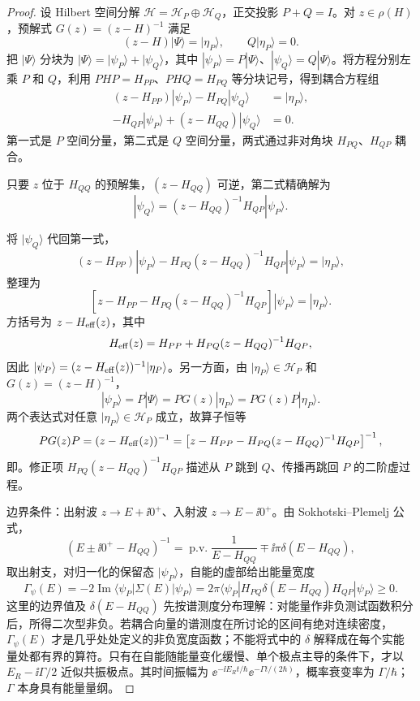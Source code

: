 \begin{proof}
设 Hilbert 空间分解 \(\mathcal H=\mathcal H_P\oplus\mathcal H_Q\)，正交投影 \(P+Q=I\)。对 \(z\in\rho(H)\)，预解式 \(G(z)=(z-H)^{-1}\) 满足
\[
 (z-H)|\Psi\rangle=|\eta_P\rangle,
 \qquad Q|\eta_P\rangle=0.
\]
把 \(|\Psi\rangle\) 分块为 \(|\Psi\rangle=|\psi_P\rangle+|\psi_Q\rangle\)，其中 \(|\psi_P\rangle=P|\Psi\rangle\)、\(|\psi_Q\rangle=Q|\Psi\rangle\)。将方程分别左乘 \(P\) 和 \(Q\)，利用 \(PHP=H_{PP}\)、\(PHQ=H_{PQ}\) 等分块记号，得到耦合方程组
\begin{align*}
 (z-H_{PP})|\psi_P\rangle-H_{PQ}|\psi_Q\rangle
 &=|\eta_P\rangle,\\
 -H_{QP}|\psi_P\rangle+(z-H_{QQ})|\psi_Q\rangle
 &=0.
\end{align*}
第一式是 \(P\) 空间分量，第二式是 \(Q\) 空间分量，两式通过非对角块 \(H_{PQ}\)、\(H_{QP}\) 耦合。

只要 \(z\) 位于 \(H_{QQ}\) 的预解集，\((z-H_{QQ})\) 可逆，第二式精确解为
\[
 |\psi_Q\rangle
 =(z-H_{QQ})^{-1}H_{QP}|\psi_P\rangle.
\]


将 \(|\psi_Q\rangle\) 代回第一式，
\[
 (z-H_{PP})|\psi_P\rangle
 -H_{PQ}(z-H_{QQ})^{-1}H_{QP}|\psi_P\rangle
 =|\eta_P\rangle,
\]
整理为
\[
 \left[z-H_{PP}
 -H_{PQ}(z-H_{QQ})^{-1}H_{QP}\right]|\psi_P\rangle
 =|\eta_P\rangle.
\]
方括号为 $z-H_{\rm eff}(z)$，其中
\[
 H_{\rm eff}(z)=H_{PP}+H_{PQ}(z-H_{QQ})^{-1}H_{QP},
\]
因此 \(|\psi_P\rangle=(z-H_{\rm eff}(z))^{-1}|\eta_P\rangle\)。另一方面，由 \(|\eta_P\rangle\in\mathcal H_P\) 和 \(G(z)=(z-H)^{-1}\)，
\[
 |\psi_P\rangle=P|\Psi\rangle=PG(z)|\eta_P\rangle=PG(z)P|\eta_P\rangle.
\]
两个表达式对任意 \(|\eta_P\rangle\in\mathcal H_P\) 成立，故算子恒等
\[
 PG(z)P=(z-H_{\rm eff}(z))^{-1}
 =\left[z-H_{PP}-H_{PQ}(z-H_{QQ})^{-1}H_{QP}\right]^{-1},
\]
即。修正项 \(H_{PQ}(z-H_{QQ})^{-1}H_{QP}\) 描述从 \(P\) 跳到 \(Q\)、传播再跳回 \(P\) 的二阶虚过程。

边界条件：出射波 \(z\to E+\ii0^+\)、入射波 \(z\to E-\ii0^+\)。由 Sokhotski--Plemelj 公式，
\[
 (E\pm\ii0^+-H_{QQ})^{-1}
 =\operatorname{p.v.}\frac1{E-H_{QQ}}
 \mp\ii\pi\delta(E-H_{QQ}),
\]
取出射支，对归一化的保留态 $|\psi_P\rangle$，自能的虚部给出能量宽度
\[
 \Gamma_\psi(E)=-2\operatorname{Im}\langle\psi_P|\Sigma(E)|\psi_P\rangle
 =2\pi\langle\psi_P|H_{PQ}\delta(E-H_{QQ})H_{QP}|\psi_P\rangle\ge0.
\]
这里的边界值及 $\delta(E-H_{QQ})$ 先按谱测度分布理解：对能量作非负测试函数积分后，所得二次型非负。若耦合向量的谱测度在所讨论的区间有绝对连续密度，$\Gamma_\psi(E)$ 才是几乎处处定义的非负宽度函数；不能将式中的 $\delta$ 解释成在每个实能量处都有界的算符。只有在自能随能量变化缓慢、单个极点主导的条件下，才以 $E_R-\ii\Gamma/2$ 近似共振极点。其时间振幅为 $\ee^{-\ii E_Rt/\hbar}\ee^{-\Gamma t/(2\hbar)}$，概率衰变率为 $\Gamma/\hbar$；$\Gamma$ 本身具有能量量纲。
\end{proof}

